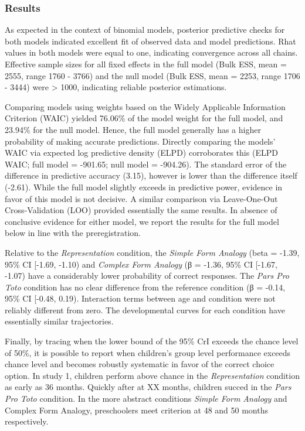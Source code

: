 \documentclass[
  man]{apa6}
\begin{document}
\subsubsection{Results}\label{results}

As expected in the context of binomial models, posterior predictive checks for both models indicated excellent fit of observed data and model predictions. Rhat values in both models were equal to one, indicating convergence across all chains. Effective sample sizes for all fixed effects in the full model (Bulk ESS, mean = 2555, range 1760 - 3766) and the null model (Bulk ESS, mean = 2253, range 1706 - 3444) were \textgreater{} 1000, indicating reliable posterior estimations.

Comparing models using weights based on the Widely Applicable Information Criterion (WAIC) yielded 76.06\% of the model weight for the full model, and 23.94\% for the null model. Hence, the full model generally has a higher probability of making accurate predictions. Directly comparing the models' WAIC via expected log predictive density (ELPD) corroborates this (ELPD WAIC; full model = -901.65; null model = -904.26). The standard error of the difference in predictive accuracy (3.15), however is lower than the difference itself (-2.61). While the full model slightly exceeds in predictive power, evidence in favor of this model is not decisive. A similar comparison via Leave-One-Out Cross-Validation (LOO) provided essentially the same results. In absence of conclusive evidence for either model, we report the results for the full model below in line with the preregistration.

Relative to the \emph{Representation} condition, the \emph{Simple Form Analogy} (beta = -1.39, 95\% CI {[}-1.69, -1.10) and \emph{Complex Form Analogy} (β = -1.36, 95\% CI {[}-1.67, -1.07) have a considerably lower probability of correct responses. The \emph{Pars Pro Toto} condition has no clear difference from the reference condition (β = -0.14, 95\% CI {[}-0.48, 0.19). Interaction terms between age and condition were not reliably different from zero. The developmental curves for each condition have essentially similar trajectories.

Finally, by tracing when the lower bound of the 95\% CrI exceeds the chance level of 50\%, it is possible to report when children's group level performance exceeds chance level and becomes robustly systematic in favor of the correct choice option. In study 1, children perform above chance in the \emph{Representation} condition as early as 36 months. Quickly after at XX months, children succed in the \emph{Pars Pro Toto} condition. In the more abstract conditions \emph{Simple Form Analogy} and Complex Form Analogy, preschoolers meet criterion at 48 and 50 months respectively.
\end{document}
